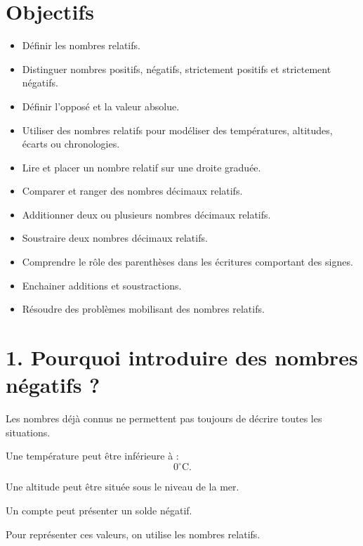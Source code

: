 
\section{Objectifs}

\begin{itemize}
\item Définir les nombres relatifs.
\item Distinguer nombres positifs, négatifs, strictement positifs et strictement négatifs.
\item Définir l'opposé et la valeur absolue.
\item Utiliser des nombres relatifs pour modéliser des températures, altitudes, écarts ou chronologies.
\item Lire et placer un nombre relatif sur une droite graduée.
\item Comparer et ranger des nombres décimaux relatifs.
\item Additionner deux ou plusieurs nombres décimaux relatifs.
\item Soustraire deux nombres décimaux relatifs.
\item Comprendre le rôle des parenthèses dans les écritures comportant des signes.
\item Enchainer additions et soustractions.
\item Résoudre des problèmes mobilisant des nombres relatifs.
\end{itemize}

\section{1. Pourquoi introduire des nombres négatifs ?}

Les nombres déjà connus ne permettent pas toujours de décrire toutes les situations.

Une température peut être inférieure à :
\[
0^\circ\text{C}.
\]

Une altitude peut être située sous le niveau de la mer.

Un compte peut présenter un solde négatif.

Pour représenter ces valeurs, on utilise les nombres relatifs.


